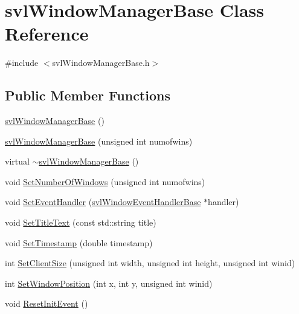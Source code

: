 \hypertarget{classsvl_window_manager_base}{}\section{svl\+Window\+Manager\+Base Class Reference}
\label{classsvl_window_manager_base}


{\ttfamily \#include $<$svl\+Window\+Manager\+Base.\+h$>$}

\subsection*{Public Member Functions}
\begin{DoxyCompactItemize}
\item 
\hyperlink{classsvl_window_manager_base_a5087b4d9af2db708f81be376cf46b06b}{svl\+Window\+Manager\+Base} ()
\item 
\hyperlink{classsvl_window_manager_base_add84ebed327a1b2faa7e6a5d73f17d73}{svl\+Window\+Manager\+Base} (unsigned int numofwins)
\item 
virtual \hyperlink{classsvl_window_manager_base_ac1c83fd91d1b3367303d39d886c6f885}{$\sim$svl\+Window\+Manager\+Base} ()
\item 
void \hyperlink{classsvl_window_manager_base_a307227f63a55fd315fe759f3f1084740}{Set\+Number\+Of\+Windows} (unsigned int numofwins)
\item 
void \hyperlink{classsvl_window_manager_base_aeb586c4a222cd0818febff972f9be57b}{Set\+Event\+Handler} (\hyperlink{classsvl_window_event_handler_base}{svl\+Window\+Event\+Handler\+Base} $\ast$handler)
\item 
void \hyperlink{classsvl_window_manager_base_a678c57c6ff692a26ef40dd8368cb9f2b}{Set\+Title\+Text} (const std\+::string title)
\item 
void \hyperlink{classsvl_window_manager_base_a5b7747b205fa459716743386bf4a5f2d}{Set\+Timestamp} (double timestamp)
\item 
int \hyperlink{classsvl_window_manager_base_ae03da24470c7298a5d8cec2877aed30c}{Set\+Client\+Size} (unsigned int width, unsigned int height, unsigned int winid)
\item 
int \hyperlink{classsvl_window_manager_base_a2060e663694a740606e9c7ced951bf25}{Set\+Window\+Position} (int x, int y, unsigned int winid)
\item 
void \hyperlink{classsvl_window_manager_base_aaf4f945998c257510fbc77c1d80f1648}{Reset\+Init\+Event} ()
\item 

\end{DoxyCompactItemize}
